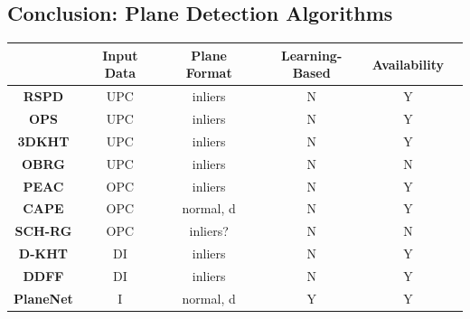 \documentclass[main.tex]{subfiles}
\begin{document}
\subsection{Conclusion: Plane Detection Algorithms}
\begin{table}[H]
    \centering
    \begin{tabular}{|c|c|c|c|c|c}
        \hline
                                                                         & \textbf{Input Data} & \textbf{Plane Format} & \textbf{Learning-Based} & \textbf{Availability} \\ \hline
        \textbf{RSPD} \cite{Araújo_Oliveira_2020}                        & UPC                 & inliers               & N                       & Y                     \\ \hline
        \textbf{OPS} \cite{Sun_Mordohai_2019}                            & UPC                 & inliers               & N                       & Y                     \\ \hline
        \textbf{3DKHT} \cite{Limberger_Oliveira_2015}                    & UPC                 & inliers               & N                       & Y                     \\ \hline
        \textbf{OBRG} \cite{Vo_Truong-Hong_Laefer_Bertolotto_2015}       & UPC                 & inliers               & N                       & N                     \\ \hline
        \textbf{PEAC} \cite{Feng_Taguchi_Kamat_2014}                     & OPC                 & inliers               & N                       & Y                     \\ \hline
        \textbf{CAPE} \cite{Proença_Gao_2018}                            & OPC                 & normal, d             & N                       & Y                     \\ \hline
        \textbf{SCH-RG} \cite{Mols_Li_Hanebeck_2020}                     & OPC                 & inliers?              & N                       & N                     \\ \hline
        \textbf{D-KHT}  \cite{Vera_Lucio_Fernandes_Velho_2018}           & DI                  & inliers               & N                       & Y                     \\ \hline
        \textbf{DDFF} \cite{Roychoudhury_Missura_Bennewitz_2021}         & DI                  & inliers               & N                       & Y                     \\ \hline
        \textbf{PlaneNet} \cite{Liu_Yang_Ceylan_Yumer_Furukawa_2018}     & I                   & normal, d             & Y                       & Y                     \\ \hline

\end{tabular}
\end{table}
\end{document}
